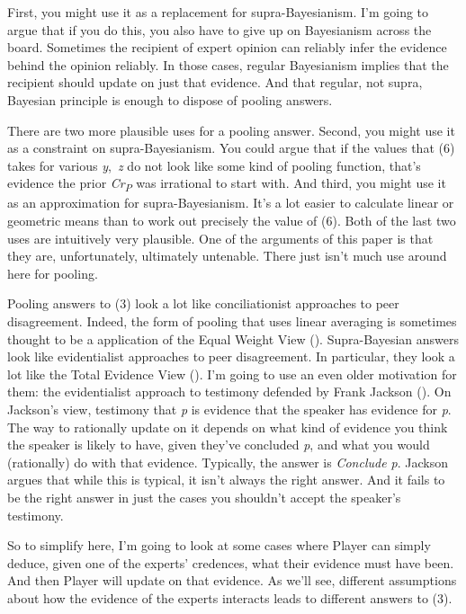 \documentclass[
  10pt,
  letterpaper,
  DIV=11,
  numbers=noendperiod,
  twoside]{scrartcl}
\begin{document}
First, you might use it as a replacement for supra-Bayesianism. I'm
going to argue that if you do this, you also have to give up on
Bayesianism across the board. Sometimes the recipient of expert opinion
can reliably infer the evidence behind the opinion reliably. In those
cases, regular Bayesianism implies that the recipient should update on
just that evidence. And that regular, not supra, Bayesian principle is
enough to dispose of pooling answers.

There are two more plausible uses for a pooling answer. Second, you
might use it as a constraint on supra-Bayesianism. You could argue that
if the values that (6) takes for various \emph{y},~\emph{z} do not look
like some kind of pooling function, that's evidence the prior
\emph{Cr\textsubscript{P}} was irrational to start with. And third, you
might use it as an approximation for supra-Bayesianism. It's a lot
easier to calculate linear or geometric means than to work out precisely
the value of (6). Both of the last two uses are intuitively very
plausible. One of the arguments of this paper is that they are,
unfortunately, ultimately untenable. There just isn't much use around
here for pooling.

Pooling answers to (3) look a lot like conciliationist approaches to
peer disagreement. Indeed, the form of pooling that uses linear
averaging is sometimes thought to be a application of the Equal Weight
View (). Supra-Bayesian answers look
like evidentialist approaches to peer disagreement. In particular, they
look a lot like the Total Evidence View
(). I'm going to use an
even older motivation for them: the evidentialist approach to testimony
defended by Frank Jackson (). On
Jackson's view, testimony that \emph{p} is evidence that the speaker has
evidence for \emph{p}. The way to rationally update on it depends on
what kind of evidence you think the speaker is likely to have, given
they've concluded \emph{p}, and what you would (rationally) do with that
evidence. Typically, the answer is \emph{Conclude p}. Jackson argues
that while this is typical, it isn't always the right answer. And it
fails to be the right answer in just the cases you shouldn't accept the
speaker's testimony.

So to simplify here, I'm going to look at some cases where Player can
simply deduce, given one of the experts' credences, what their evidence
must have been. And then Player will update on that evidence. As we'll
see, different assumptions about how the evidence of the experts
interacts leads to different answers to (3).
\end{document}

